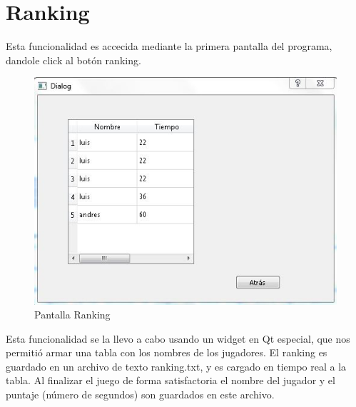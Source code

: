 \section{Ranking}
Esta funcionalidad es accecida mediante la primera pantalla del programa, dandole click al botón ranking.
\begin{figure}[htbp]
\begin{center}
\includegraphics[width=.60\textwidth]{./imagenes/5.jpg}
\caption{Pantalla Ranking}
\label{Pantalla Ranking}
\end{center}
\end{figure}


Esta funcionalidad se la llevo a cabo usando un widget en Qt especial, que nos permitió armar una tabla con los nombres de los jugadores. El ranking es guardado en un archivo de texto ranking.txt, y es cargado en tiempo real a la tabla. Al finalizar el juego de forma satisfactoria el nombre del jugador y el puntaje (número de segundos) son guardados en este archivo.

